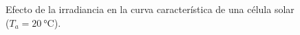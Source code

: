 %
\begin{figure}
\begin{centering}
\par\end{centering}

\begin{centering}
\end{centering}

\caption{Efecto de la irradiancia en la curva característica de una célula
solar ($T_a=\SI{20}{\celsius}$).\label{fig:EfectoIrradiancia}}

\end{figure}



